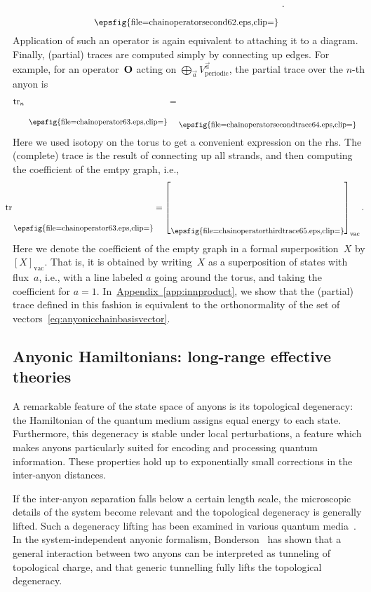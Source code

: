 \documentclass[floats,prb,twocolumn]{revtex4}
\newcommand{\appref}[1]{\hyperref[#1]{{Appendix~\ref*{#1}}}}
\newcommand*{\tr}{\mathop{\mathrm{tr}}\nolimits}
\newcommand*{\Xsingleoperator}{{\bf O}}
\newcommand*{\chainoperatorsecond}{\raisebox{-20.466pt}{\epsfig{file=chainoperatorsecond62.eps,clip=}}}
\newcommand*{\chainoperator}{\raisebox{-26.103pt}{\epsfig{file=chainoperator63.eps,clip=}}}
\newcommand*{\chainoperatorsecondtrace}{\raisebox{-29.646pt}{\epsfig{file=chainoperatorsecondtrace64.eps,clip=}}}
\newcommand*{\chainoperatorthirdtrace}{\raisebox{-29.646pt}{\epsfig{file=chainoperatorthirdtrace65.eps,clip=}}}
\begin{document}
\begin{align*}
\scalebox{0.9}{\chainoperatorsecond}\ .
\end{align*}
Application of such an operator is again equivalent to attaching it to a diagram. Finally, (partial) traces are computed simply by connecting up edges. For example, for an operator~$\Xsingleoperator$ acting on  $\bigoplus_{\vec{a}}V^{\vec{a}}_{\textrm{periodic}}$, the partial trace over the $n$-th anyon is
\begin{align*}
\tr_n\ \scalebox{0.9}{\chainoperator} &=\scalebox{0.9}{\chainoperatorsecondtrace}
\end{align*}
Here we used isotopy on the torus to get a convenient expression on the rhs. The (complete) trace is the result of connecting up all strands, and then computing the coefficient of the emtpy graph, i.e., 
\begin{align}
\hspace{-2ex}\tr\scalebox{0.9}{\chainoperator} &=\left[\scalebox{0.9}{\chainoperatorthirdtrace}\right]_{\textrm{vac}}.\hspace{-2ex}\label{eq:traceofopperiodic}
\end{align}
Here we denote the coefficient of the empty graph in a formal superposition~$X$ by $[X]_{\textrm{vac}}$. That is, it is obtained by writing~$X$ as a superposition of states with flux~$a$, i.e., with a line labeled $a$ going around the torus, and taking  the coefficient for $a=1$. In~\appref{app:innproduct}, we show that  the (partial) trace defined in this fashion  is equivalent to the orthonormality of the set of vectors~\eqref{eq:anyonicchainbasisvector}.


\subsection{Anyonic Hamiltonians: long-range effective theories\label{sec:longrangeffective}}
A remarkable feature of the state space of anyons is its topological degeneracy: the Hamiltonian of the quantum medium assigns equal energy to each state. Furthermore, this degeneracy is stable under local perturbations, a feature which makes anyons particularly suited for encoding and processing quantum information. These properties hold up to exponentially small corrections in the inter-anyon distances.

If the inter-anyon separation falls below a certain length scale, the microscopic details of the system become relevant and the topological degeneracy is generally lifted. Such a degeneracy lifting has been examined in various quantum media~\cite{Lahtinen08,Baraban09,cheng09}.  In the system-independent anyonic formalism, Bonderson~\cite{bonderson09} has shown that a general interaction between two anyons can be interpreted as tunneling of topological charge, and that generic tunnelling fully lifts the topological degeneracy.
\end{document}
